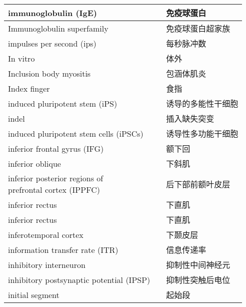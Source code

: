 \begin{longtable}{lll}
	\midrule
	immunoglobulin (IgE)   && 免疫球蛋白  \\
	
	\midrule
	Immunoglobulin superfamily   && 免疫球蛋白超家族  \\
	
	\midrule
	impulses per second (ips)   && 每秒脉冲数  \\
	
	\midrule
	In vitro   && 体外  \\
	
	\midrule
	Inclusion body myositis  && 包涵体肌炎  \\
	
	\midrule
	Index finger  && 食指  \\
	
	\midrule
	induced pluripotent stem (iPS)  && 诱导的多能性干细胞  \\
	
	\midrule
	indel   && 插入缺失突变  \\
	
	\midrule
	induced pluripotent stem cells (iPSCs)  && 诱导性多功能干细胞  \\
	
	\midrule
	inferior frontal gyrus (IFG)   && 额下回  \\
	
	\midrule
	inferior oblique   && 下斜肌  \\
	
	\midrule
	\makecell[l]{inferior posterior regions of \\ prefrontal cortex (IPPFC)}  && 后下部前额叶皮层  \\
	
	\midrule
	inferior rectus   && 下直肌  \\
	
	\midrule
	inferior rectus   && 下直肌  \\
	
	\midrule
	inferotemporal cortex   && 下颞皮层  \\
	
	\midrule
	information transfer rate (ITR)   && 信息传递率  \\
	
	\midrule
	inhibitory interneuron  && 抑制性中间神经元  \\
	
	\midrule
	inhibitory postsynaptic potential (IPSP)  && 抑制性突触后电位  \\
	
	\midrule
	initial segment && 起始段  \\
	

\end{longtable}
